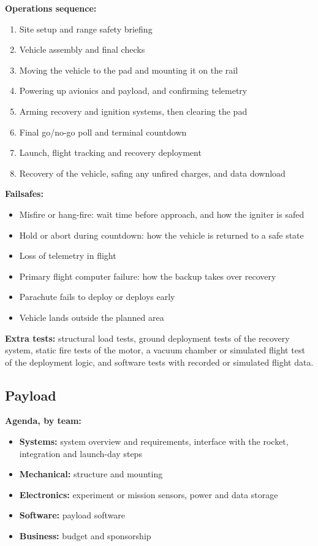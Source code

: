 \documentclass{../../Common/Latex/Templates/rapport}
\renewcommand{\vsubsection}[1]{\subsection{#1}}
\begin{document}
\noindent\textbf{Operations sequence:}
\begin{enumerate}
  \item Site setup and range safety briefing
  \item Vehicle assembly and final checks
  \item Moving the vehicle to the pad and mounting it on the rail
  \item Powering up avionics and payload, and confirming telemetry
  \item Arming recovery and ignition systems, then clearing the pad
  \item Final go/no-go poll and terminal countdown
  \item Launch, flight tracking and recovery deployment
  \item Recovery of the vehicle, safing any unfired charges, and data download
\end{enumerate}

\noindent\textbf{Failsafes:}
\begin{itemize}
  \item Misfire or hang-fire: wait time before approach, and how the igniter is safed
  \item Hold or abort during countdown: how the vehicle is returned to a safe state
  \item Loss of telemetry in flight
  \item Primary flight computer failure: how the backup takes over recovery
  \item Parachute fails to deploy or deploys early
  \item Vehicle lands outside the planned area
\end{itemize}

\noindent\textbf{Extra tests:} structural load tests, ground deployment tests of the recovery system, static fire tests of the motor, a vacuum chamber or simulated flight test of the deployment logic, and software tests with recorded or simulated flight data.

\vsubsection{Payload}
\noindent\textbf{Agenda, by team:}
\begin{itemize}
  \item \textbf{Systems:} system overview and requirements, interface with the rocket, integration and launch-day steps
  \item \textbf{Mechanical:} structure and mounting
  \item \textbf{Electronics:} experiment or mission sensors, power and data storage
  \item \textbf{Software:} payload software
  \item \textbf{Business:} budget and sponsorship
\end{itemize}
\end{document}
